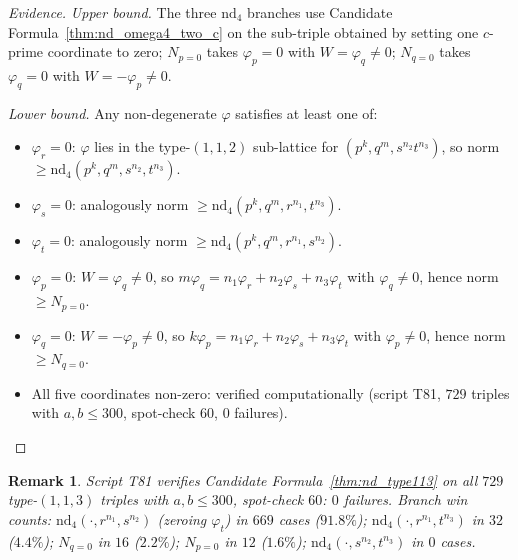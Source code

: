 \documentclass[12pt]{article}
\newtheorem{remark}{Remark}
\theoremstyle{definition}
\begin{document}
\begin{proof}[Evidence]
  \textit{Upper bound.}  The three $\mathrm{nd}_{4}$ branches use
  Candidate Formula~\ref{thm:nd_omega4_two_c} on the sub-triple obtained by setting
  one $c$-prime coordinate to zero; $N_{p=0}$ takes $\varphi_p = 0$ with
  $W = \varphi_q \ne 0$; $N_{q=0}$ takes $\varphi_q = 0$ with $W = -\varphi_p \ne 0$.

  \textit{Lower bound.}
  Any non-degenerate $\varphi$ satisfies at least one of:
  \begin{itemize}
    \item $\varphi_r = 0$: $\varphi$ lies in the type-$(1,1,2)$ sub-lattice for
      $(p^k,q^m,s^{n_2}t^{n_3})$, so norm $\ge \mathrm{nd}_{4}(p^k,q^m,s^{n_2},t^{n_3})$.
    \item $\varphi_s = 0$: analogously norm $\ge \mathrm{nd}_{4}(p^k,q^m,r^{n_1},t^{n_3})$.
    \item $\varphi_t = 0$: analogously norm $\ge \mathrm{nd}_{4}(p^k,q^m,r^{n_1},s^{n_2})$.
    \item $\varphi_p = 0$: $W = \varphi_q \ne 0$, so $m\varphi_q
      = n_1\varphi_r + n_2\varphi_s + n_3\varphi_t$ with $\varphi_q \ne 0$,
      hence norm $\ge N_{p=0}$.
    \item $\varphi_q = 0$: $W = -\varphi_p \ne 0$, so $k\varphi_p
      = n_1\varphi_r + n_2\varphi_s + n_3\varphi_t$ with $\varphi_p \ne 0$,
      hence norm $\ge N_{q=0}$.
    \item All five coordinates non-zero: verified computationally (script T81,
      $729$ triples with $a, b \le 300$, spot-check $60$, $0$ failures).
  \end{itemize}
\end{proof}

\begin{remark}
  Script T81 verifies Candidate Formula~\ref{thm:nd_type113} on all $729$ type-$(1,1,3)$
  triples with $a, b \le 300$, spot-check $60$: $0$ failures.
  Branch win counts: $\mathrm{nd}_{4}(\cdot,r^{n_1},s^{n_2})$ (zeroing $\varphi_t$) in
  $669$ cases ($91.8\%$); $\mathrm{nd}_{4}(\cdot,r^{n_1},t^{n_3})$ in $32$ ($4.4\%$);
  $N_{q=0}$ in $16$ ($2.2\%$); $N_{p=0}$ in $12$ ($1.6\%$);
  $\mathrm{nd}_{4}(\cdot,s^{n_2},t^{n_3})$ in $0$ cases.
\end{remark}
\end{document}
